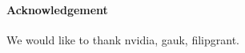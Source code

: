 \documentclass{itatnew}
\begin{document}
\paragraph{Acknowledgement}
We would like to thank nvidia, gauk, filipgrant.





\end{document}
